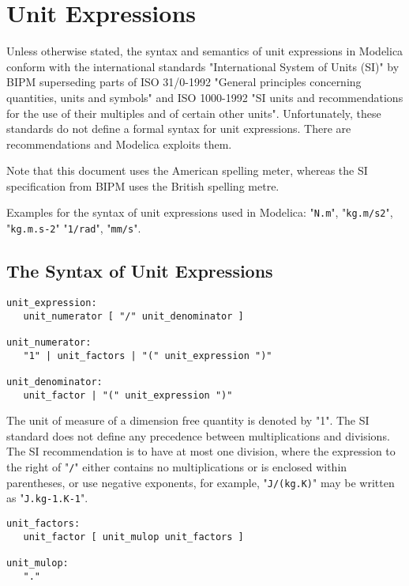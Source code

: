 \chapter{Unit Expressions}

Unless otherwise stated, the syntax and semantics of unit expressions in
Modelica conform with the international standards 
"International System of Units (SI)" by BIPM superseding parts of 
ISO 31/0-1992
"General principles concerning quantities, units and symbols" and ISO
1000-1992 "SI units and recommendations for the use of their multiples
and of certain other units". 
Unfortunately, these standards do not define a formal syntax for
unit expressions. There are recommendations and Modelica exploits them.

Note that this document uses the American spelling meter, whereas the SI specification from BIPM uses the British spelling metre.

Examples for the syntax of unit expressions used in Modelica: "\lstinline!N.m!",
"\lstinline!kg.m/s2!", "\lstinline!kg.m.s-2!" "\lstinline!1/rad!", 
"\lstinline!mm/s!".

\section{The Syntax of Unit Expressions}
\begin{lstlisting}[language=grammar]
unit_expression:
   unit_numerator [ "/" unit_denominator ]
   
unit_numerator:
   "1" | unit_factors | "(" unit_expression ")"
   
unit_denominator:
   unit_factor | "(" unit_expression ")"
\end{lstlisting}

The unit of measure of a dimension free quantity is denoted by "1". The
SI standard does not define any precedence between multiplications and
divisions. The SI recommendation is to have at most one division, where
the expression to the right of "\lstinline!/!" either contains no multiplications or
is enclosed within parentheses, or use negative
exponents, for example, "\lstinline!J/(kg.K)!" may be written as "\lstinline!J.kg-1.K-1!".

\begin{lstlisting}[language=grammar]
unit_factors:
   unit_factor [ unit_mulop unit_factors ]

unit_mulop:
   "."
\end{lstlisting}

